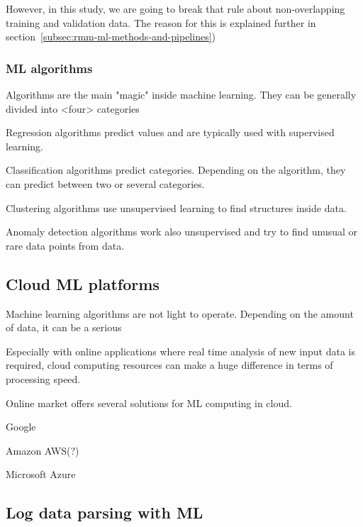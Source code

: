 However, in this study,
we are going to break that rule
about non-overlapping training and validation data.
The reason for this is explained further in section~\ref{subsec:rmm-ml-methods-and-pipelines})

\subsubsection*{ML algorithms}
Algorithms are the main "magic" inside machine learning. %
They can be generally divided into <four> categories %

Regression algorithms predict values
and are typically used with supervised learning.

Classification algorithms predict categories.
Depending on the algorithm,
they can predict between two or several categories.

Clustering algorithms use unsupervised learning
to find structures inside data.

Anomaly detection algorithms work also unsupervised
and try to find unusual or rare data points from data.


\subsection{Cloud ML platforms}\label{subsec:bg-cloud-ml-platforms}

Machine learning algorithms are not light to operate.
Depending on the amount of data,
it can be a serious %

Especially with online applications
where real time analysis of new input data is required,
cloud computing resources can make a huge difference
in terms of processing speed. %

Online market offers several solutions for ML computing in cloud.

Google

Amazon AWS(?)

Microsoft Azure\cite{altexsoft}




\subsection{Log data parsing with ML}\label{subsec:bg-log-data-parsing-with-ml}

